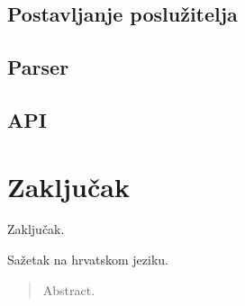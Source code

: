\documentclass[times, utf8, zavrsni]{fer}
\begin{document}

\section{Postavljanje poslužitelja}
\section{Parser}
\section{API}

\chapter{Zaključak}
Zaključak.




\begin{sazetak}
Sažetak na hrvatskom jeziku.

\end{sazetak}

\begin{abstract}
Abstract.

\end{abstract}
\end{document}
